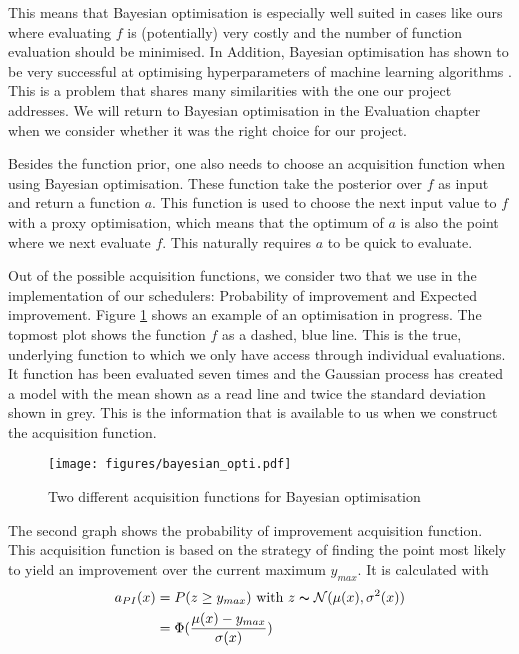 \documentclass[a4paper,12pt,twoside,openright]{report}
\begin{document}
This means that Bayesian optimisation is especially well suited in cases like ours where evaluating $f$ is (potentially) very costly and the number of function evaluation should be minimised. In Addition, Bayesian optimisation has shown to be very successful at optimising hyperparameters of machine learning algorithms \cite{PracticalBayesianOptimization}. This is a problem that shares many similarities with the one our project addresses. We will return to Bayesian optimisation in the Evaluation chapter when we consider whether it was the right choice for our project.

Besides the function prior, one also needs to choose an acquisition function when using Bayesian optimisation. These function take the posterior over $f$ as input and return a function $a$. This function is used to choose the next input value to $f$ with a proxy optimisation, which means that the optimum of $a$ is also the point where we next evaluate $f$. This naturally requires $a$ to be quick to evaluate.

Out of the possible acquisition functions, we consider two that we use in the implementation of our schedulers: Probability of improvement and Expected improvement. Figure \ref{bayesianopti} shows an example of an optimisation in progress. The topmost plot shows the function $f$ as a dashed, blue line. This is the true, underlying function to which we only have access through individual evaluations. It function has been evaluated seven times and the Gaussian process has created a model with the mean shown as a read line and twice the standard deviation shown in grey. This is the information that is available to us when we construct the acquisition function.

\begin{figure}
\centering
  \texttt{[image: figures/bayesian\_opti.pdf]}
  \caption{Two different acquisition functions for Bayesian optimisation}
  \label{bayesianopti}
\end{figure}

The second graph shows the probability of improvement acquisition function. This acquisition function is based on the strategy of finding the point most likely to yield an improvement over the current maximum $y_{max}$. It is calculated with
\begin{align}
a_{PI}(x) &= P(z \geq y_{max}) \text{\ with\ } z \thicksim \mathcal{N}(\mu(x),\sigma^2(x))\label{eq:pi_equation}\\
&=\Phi(\frac{\mu(x) - y_{max}}{\sigma(x)})
\end{align}
\end{document}
